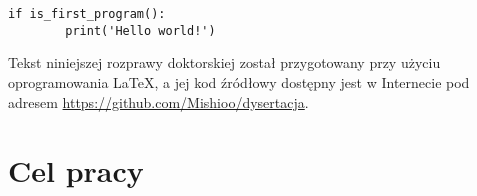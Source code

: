 \begin{Verbatim}[samepage=true]
    if is_first_program():
        print('Hello world!')
\end{Verbatim}

Tekst niniejszej rozprawy doktorskiej został przygotowany przy użyciu oprogramowania \LaTeX,
a jej kod źródłowy dostępny jest w Internecie pod adresem \url{https://github.com/Mishioo/dysertacja}.

\begin{fullwidth}
\printglossary[title=Wykaz skrótów, type=\acronymtype]
\end{fullwidth}

\section{Cel pracy}
